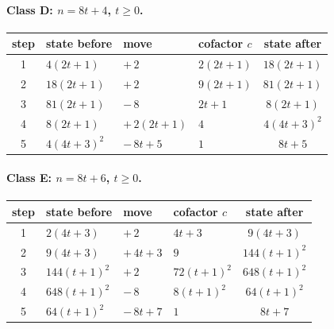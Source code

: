 \paragraph{Class D: $n=8 t + 4$, $t\ge 0$.}
\begin{center}\small\begin{tabular}{@{}clllc@{}}\toprule
step & state before & move & cofactor $c$ & state after\\\midrule
1 & $4 \left(2 t + 1\right)$ & $+\,2$ & $2 \left(2 t + 1\right)$ & $18 \left(2 t + 1\right)$ \\
2 & $18 \left(2 t + 1\right)$ & $+\,2$ & $9 \left(2 t + 1\right)$ & $81 \left(2 t + 1\right)$ \\
3 & $81 \left(2 t + 1\right)$ & $-\,8$ & $2 t + 1$ & $8 \left(2 t + 1\right)$ \\
4 & $8 \left(2 t + 1\right)$ & $+\,2 \left(2 t + 1\right)$ & $4$ & $4 \left(4 t + 3\right)^{2}$ \\
5 & $4 \left(4 t + 3\right)^{2}$ & $-\,8 t + 5$ & $1$ & $8 t + 5$ \\
\bottomrule\end{tabular}\end{center}
\paragraph{Class E: $n=8 t + 6$, $t\ge 0$.}
\begin{center}\small\begin{tabular}{@{}clllc@{}}\toprule
step & state before & move & cofactor $c$ & state after\\\midrule
1 & $2 \left(4 t + 3\right)$ & $+\,2$ & $4 t + 3$ & $9 \left(4 t + 3\right)$ \\
2 & $9 \left(4 t + 3\right)$ & $+\,4 t + 3$ & $9$ & $144 \left(t + 1\right)^{2}$ \\
3 & $144 \left(t + 1\right)^{2}$ & $+\,2$ & $72 \left(t + 1\right)^{2}$ & $648 \left(t + 1\right)^{2}$ \\
4 & $648 \left(t + 1\right)^{2}$ & $-\,8$ & $8 \left(t + 1\right)^{2}$ & $64 \left(t + 1\right)^{2}$ \\
5 & $64 \left(t + 1\right)^{2}$ & $-\,8 t + 7$ & $1$ & $8 t + 7$ \\
\bottomrule\end{tabular}\end{center}
